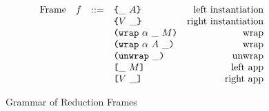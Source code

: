 \documentclass[../main.tex]{subfiles}
\begin{document}
\begin{figure*}[t]
    \centering
    \[\begin{array}{lrclr}
        \textrm{Frame} & f & ::= & \texttt{\{}\_ ~ A\texttt{\}}                     & \textrm{left instantiation}\\
                       &   &     & \texttt{\{}V ~ \_\texttt{\}}                    & \textrm{right instantiation}\\
                       &   &     & \texttt{(} \texttt{wrap} ~ \alpha ~ \_ ~ M \texttt{)}             & \textrm{wrap}\\
                       &   &     & \texttt{(} \texttt{wrap} ~ \alpha ~ A ~ \_ \texttt{)}            & \textrm{wrap}\\
                       &   &     & \texttt{(} \texttt{unwrap} ~ \_ \texttt{)}{}                        & \textrm{unwrap}\\
                       &   &     & \texttt{[} \_ ~ M \texttt{]}                      & \textrm{left app}\\
                       &   &     & \texttt{[} V ~ \_ \texttt{]}                     & \textrm{right app}\\
    \end{array}\]
    \caption{Grammar of Reduction Frames}
    \label{fig:Plutus_core_reduction_frames}
\end{figure*}
\end{document}
